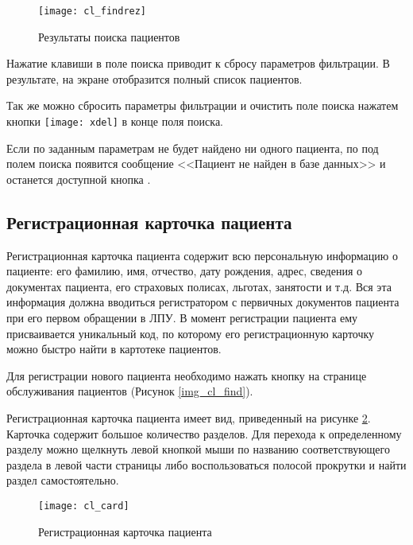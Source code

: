 \begin{figure}[ht]\centering
 \texttt{[image: cl\_findrez]}
 \caption{Результаты поиска пациентов}
 \label{img_cl_findrez}
\end{figure} 

\begin{vnim}
Нажатие клавиши  в поле поиска приводит к сбросу параметров фильтрации. В результате, на экране отобразится полный список пациентов.
\end{vnim}

Так же можно сбросить параметры фильтрации и очистить поле поиска нажатем кнопки \texttt{[image: xdel]} в конце поля поиска.

Если по заданным параметрам не будет найдено ни одного пациента, по под полем поиска появится сообщение <<Пациент не найден в базе данных>> и останется доступной кнопка .

\subsection{Регистрационная карточка пациента} \label{cl_card}

Регистрационная карточка пациента содержит всю персональную информацию о пациенте: его фамилию, имя, отчество, дату рождения, адрес, сведения о документах пациента, его страховых полисах, льготах, занятости и т.д. Вся эта информация должна вводиться регистратором с первичных документов пациента при его первом обращении в ЛПУ. В момент регистрации пациента ему присваивается уникальный код, по которому его регистрационную карточку можно быстро найти в картотеке пациентов.

Для регистрации нового пациента необходимо нажать  кнопку  на странице обслуживания пациентов (Рисунок \ref{img_cl_find}). 

Регистрационная карточка пациента имеет вид, приведенный на рисунке \ref{img_cl_card}. Карточка содержит большое количество разделов. Для перехода к определенному разделу можно щелкнуть левой кнопкой мыши по названию соответствующего раздела в левой части страницы либо воспользоваться полосой прокрутки и найти раздел самостоятельно.  

\begin{figure}[!ht]\centering
 \texttt{[image: cl\_card]}
 \caption{Регистрационная карточка пациента}
 \label{img_cl_card}
\end{figure} 

